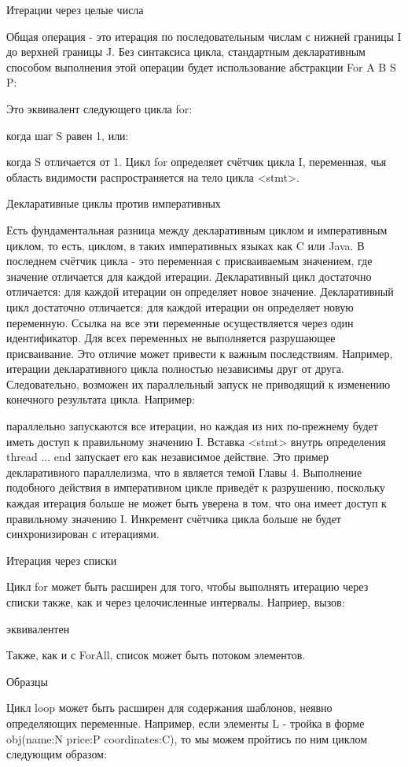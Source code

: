 Итерации через целые числа

Общая операция - это итерация по последовательным числам с нижней границы I до верхней границы J. Без синтаксиса цикла, стандартным декларативным способом выполнения этой операции будет использование абстракции {For A B S P}:

Это эквивалент следующего цикла for:

когда шаг S равен 1, или:

когда S отличается от 1. Цикл for определяет счётчик цикла I, переменная, чья область видимости распространяется на тело цикла <stmt>.

Декларативные циклы против императивных

Есть фундаментальная разница между декларативным циклом и императивным циклом, то есть, циклом, в таких императивных языках как C или Java. В последнем счётчик цикла - это переменная с присваиваемым значением, где значение отличается для каждой итерации. Декларативный цикл достаточно отличается: для каждой итерации он определяет новое значение. Декларативный цикл достаточно отличается: для каждой итерации он определяет новую переменную. Ссылка на все эти переменные осуществляется через один идентификатор. Для всех переменных не выполняется разрушающее присваивание. Это отличие может привести к важным последствиям. Например, итерации декларативного цикла полностью независимы друг от друга. Следовательно, возможен их параллельный запуск не приводящий к изменению конечного результата цикла. Например:

параллельно запускаются все итерации, но каждая из них по-прежнему будет иметь доступ к правильному значению I. Вставка <stmt> внутрь определения thread ... end запускает его как независимое действие. Это пример декларативного параллелизма, что в является темой Главы 4. Выполнение подобного действия в императивном цикле приведёт к разрушению, поскольку каждая итерация больше не может быть уверена в том, что она имеет доступ к правильному значению I. Инкремент счётчика цикла больше не будет синхронизирован с итерациями.

Итерация через списки

Цикл for может быть расширен для того, чтобы выполнять итерацию через списки также, как и через целочисленные интервалы. Наприер, вызов:

эквивалентен

Также, как и с ForAll, список может быть потоком элементов.

Образцы

Цикл loop может быть расширен для содержания шаблонов, неявно определяющих переменные. Например, если элементы L - тройка в форме obj(name:N price:P coordinates:C), то мы можем пройтись по ним циклом следующим образом:


